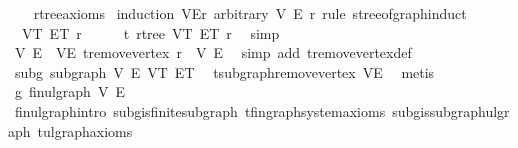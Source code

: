 \begin{isabellebody}
%
\isadelimproof
\ \ %
\endisadelimproof
%
\isatagproof
{}\isamarkupfalse%
\ rtree{\isacharunderscore}{\kern0pt}axioms\isanewline
{}\isamarkupfalse%
\ {\isacharparenleft}{\kern0pt}induction\ {\isachardoublequoteopen}{\isacharparenleft}{\kern0pt}V{\isacharcomma}{\kern0pt}E{\isacharcomma}{\kern0pt}r{\isacharparenright}{\kern0pt}{\isachardoublequoteclose}\ arbitrary{\isacharcolon}{\kern0pt}\ V\ E\ r\ rule{\isacharcolon}{\kern0pt}\ stree{\isacharunderscore}{\kern0pt}of{\isacharunderscore}{\kern0pt}graph{\isachardot}{\kern0pt}induct{\isacharparenright}{\kern0pt}\isanewline
\ \ \isamarkupfalse%
\ {\isacharparenleft}{\kern0pt}{}\ V\isactrlsub T\ E\isactrlsub T\ r{\isacharparenright}{\kern0pt}\isanewline
\ \ \isamarkupfalse%
\ \isamarkupfalse%
\ t{\isacharcolon}{\kern0pt}\ rtree\ V\isactrlsub T\ E\isactrlsub T\ r\ \isamarkupfalse%
\ simp\isanewline
\ \ \isamarkupfalse%
\ V{\isacharprime}{\kern0pt}\ E{\isacharprime}{\kern0pt}\ \ VE{\isacharprime}{\kern0pt}{\isacharcolon}{\kern0pt}\ {\isachardoublequoteopen}t{\isachardot}{\kern0pt}remove{\isacharunderscore}{\kern0pt}vertex\ r\ {\isacharequal}{\kern0pt}\ {\isacharparenleft}{\kern0pt}V{\isacharprime}{\kern0pt}{\isacharcomma}{\kern0pt}\ E{\isacharprime}{\kern0pt}{\isacharparenright}{\kern0pt}{\isachardoublequoteclose}\ \isamarkupfalse%
\ {\isacharparenleft}{\kern0pt}simp\ add{\isacharcolon}{\kern0pt}\ t{\isachardot}{\kern0pt}remove{\isacharunderscore}{\kern0pt}vertex{\isacharunderscore}{\kern0pt}def{\isacharparenright}{\kern0pt}\isanewline
\ \ \isamarkupfalse%
\ subg{\isacharcolon}{\kern0pt}\ subgraph\ V{\isacharprime}{\kern0pt}\ E{\isacharprime}{\kern0pt}\ V\isactrlsub T\ E\isactrlsub T\ \isamarkupfalse%
\ t{\isachardot}{\kern0pt}subgraph{\isacharunderscore}{\kern0pt}remove{\isacharunderscore}{\kern0pt}vertex\ VE{\isacharprime}{\kern0pt}\ \isamarkupfalse%
\ metis\isanewline
\ \ \isamarkupfalse%
\ g{\isacharprime}{\kern0pt}{\isacharcolon}{\kern0pt}\ fin{\isacharunderscore}{\kern0pt}ulgraph\ V{\isacharprime}{\kern0pt}\ E{\isacharprime}{\kern0pt}\ \isamarkupfalse%
\ fin{\isacharunderscore}{\kern0pt}ulgraph{\isachardot}{\kern0pt}intro\ subg{\isachardot}{\kern0pt}is{\isacharunderscore}{\kern0pt}finite{\isacharunderscore}{\kern0pt}subgraph\ t{\isachardot}{\kern0pt}fin{\isacharunderscore}{\kern0pt}graph{\isacharunderscore}{\kern0pt}system{\isacharunderscore}{\kern0pt}axioms\ subg{\isachardot}{\kern0pt}is{\isacharunderscore}{\kern0pt}subgraph{\isacharunderscore}{\kern0pt}ulgraph\ t{\isachardot}{\kern0pt}ulgraph{\isacharunderscore}{\kern0pt}axioms\ \isamarkupfalse%

\end{isabellebody}
